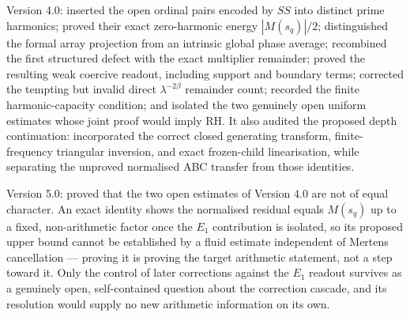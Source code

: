 \documentclass[11pt]{amsart}
\numberwithin{equation}{section}
\theoremstyle{plain}
\theoremstyle{definition}
\theoremstyle{remark}
\begin{document}
Version 4.0: inserted the open ordinal pairs encoded by $SS$ into distinct
prime harmonics; proved their exact zero-harmonic energy $|M(s_q)|/2$;
distinguished the formal array projection from an intrinsic global phase
average; recombined the first structured defect with the exact multiplier
remainder; proved the resulting weak coercive readout, including support and
boundary terms; corrected the tempting but invalid direct
$\lambda^{-2\beta}$ remainder count; recorded the finite harmonic-capacity
condition; and isolated the two genuinely open uniform estimates whose joint
proof would imply RH.  It also audited the proposed depth continuation:
incorporated the correct closed generating transform, finite-frequency
triangular inversion, and exact frozen-child linearisation, while separating
the unproved normalised ABC transfer from those identities.

Version 5.0: proved that the two open estimates of Version 4.0 are not of
equal character.  An exact identity shows the normalised residual equals
$M(s_q)$ up to a fixed, non-arithmetic factor once the $E_1$ contribution is
isolated, so its proposed upper bound cannot be established by a fluid
estimate independent of Mertens cancellation --- proving it is proving the
target arithmetic statement, not a step toward it.  Only the control of
later corrections against the $E_1$ readout survives as a genuinely open,
self-contained question about the correction cascade, and its resolution
would supply no new arithmetic information on its own.
\end{document}
